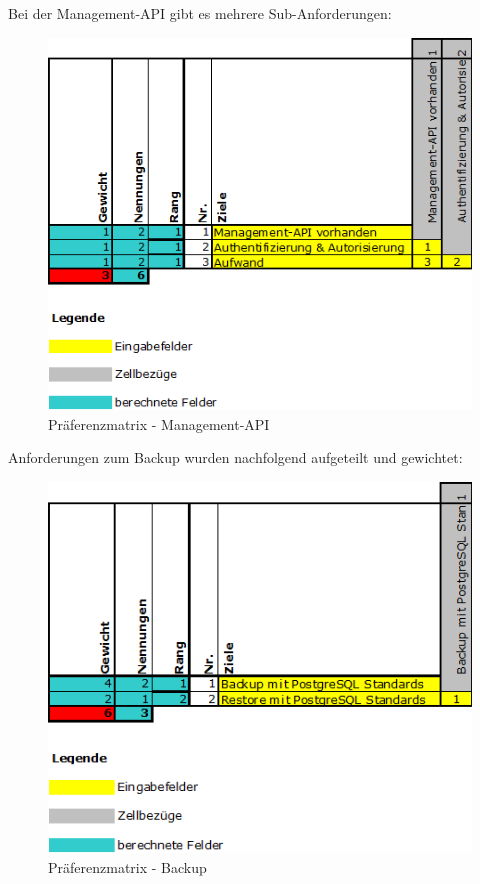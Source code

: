 \begin{flushleft}
    Bei der Management-API gibt es mehrere Sub-Anforderungen:
    \begin{figure}[H]
        \centering
        \includegraphics[width=0.75\linewidth]{source/implementation/evaluation/requirements/preference_matrix_management_api}
        \caption{Präferenzmatrix - Management-API}
        \label{fig:preference_matrix_management_api}
    \end{figure}
\end{flushleft}
\begin{flushleft}
    Anforderungen zum Backup wurden nachfolgend aufgeteilt und gewichtet:
    \begin{figure}[H]
        \centering
        \includegraphics[width=0.75\linewidth]{source/implementation/evaluation/requirements/preference_matrix_backup}
        \caption{Präferenzmatrix - Backup}
        \label{fig:preference_matrix_backup}
    \end{figure}
\end{flushleft}
